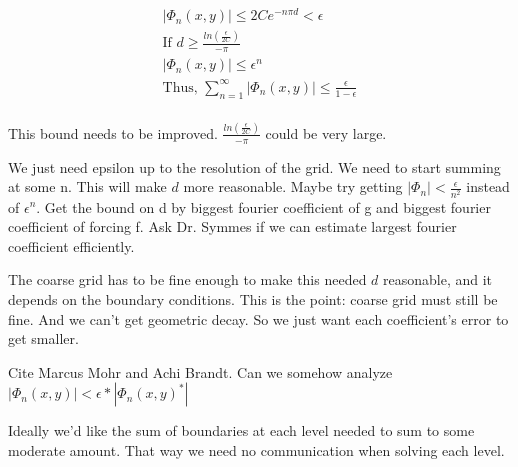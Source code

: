 \documentclass[12pt]{article}
\begin{document}
\begin{align*}
|\Phi_n(x, y)| \leq 2C e^{-n \pi d} < \epsilon\\
\text{If } d \geq \frac{ln(\frac{\epsilon}{2C})}{-\pi}\\
|\Phi_n(x, y)| \leq  \epsilon^{n}\\
\text{Thus, }\sum_{n=1}^{\infty} |\Phi_n(x, y)| \leq \frac{\epsilon}{1-\epsilon}\\
\end{align*}

This bound needs to be improved. $\frac{ln(\frac{\epsilon}{2C})}{-\pi}$ could be very large. 

We just need epsilon up to the resolution of the grid. We need to start summing at some n. This will make $d$ more reasonable. Maybe try getting $|\Phi_n| < \frac{\epsilon}{n^2}$ instead of $\epsilon^n$. Get the bound on d by biggest fourier coefficient of g and biggest fourier coefficient of forcing f. Ask Dr. Symmes if we can estimate largest fourier coefficient efficiently. 

The coarse grid has to be fine enough to make this needed $d$ reasonable, and it depends on the boundary conditions. This is the point: coarse grid must still be fine. And we can't get geometric decay. So we just want each coefficient's error to get smaller. 

Cite Marcus Mohr and Achi Brandt. Can we somehow analyze $|\Phi_n(x, y)| < \epsilon * |\Phi_n(x, y)^*|$

Ideally we'd like the sum of boundaries at each level needed to sum to some moderate amount. That way we need no communication when solving each level. 













    

\end{document}
